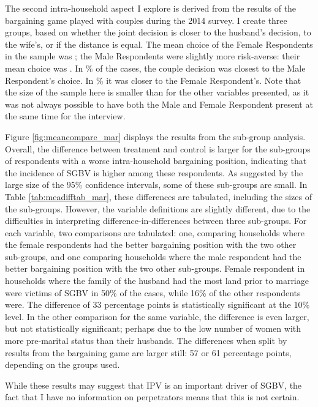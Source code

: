 The second intra-household aspect I explore is derived from the results of the bargaining game played with couples during the 2014 survey. I create three groups, based on whether the joint decision is closer to the husband's decision, to the wife's, or if the distance is equal. The mean choice of the Female Respondents in the sample was ; the Male Respondents were slightly more risk-averse: their mean choice was . In \% of the cases, the couple decision was closest to the Male Respondent's choice. In \% it was closer to the Female Respondent's. Note that the size of the sample here is smaller than for the other variables presented, as it was not always possible to have both the Male and Female Respondent present at the same time for the interview.

Figure \ref{fig:meancompare_mar} displays the results from the sub-group analysis. Overall, the difference between treatment and control is larger for the sub-groups of respondents with a worse intra-household bargaining position, indicating that the incidence of SGBV is higher among these respondents. As suggested by the large size of the 95\% confidence intervals, some of these sub-groups are small. In Table \ref{tab:meadifftab_mar}, these differences are tabulated, including the sizes of the sub-groups. However, the variable definitions are slightly different, due to the difficulties in interpreting difference-in-differences between three sub-groups. For each variable, two comparisons are tabulated: one, comparing households where the female respondents had the better bargaining position with the two other sub-groups, and one comparing households where the male respondent had the better bargaining position with the two other sub-groups. Female respondent in households where the family of the husband had the most land prior to marriage were victims of SGBV in 50\% of the cases, while 16\% of the other respondents were. The difference of 33 percentage points is statistically significant at the 10\% level. In the other comparison for the same variable, the difference is even larger, but not statistically significant; perhaps due to the low number of women with more pre-marital status than their husbands. The differences when split by results from the bargaining game are larger still: 57 or 61 percentage points, depending on the groups used.

While these results may suggest that IPV is an important driver of SGBV, the fact that I have no information on perpetrators means that this is not certain.


